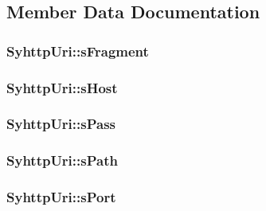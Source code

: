 \subsection{Member Data Documentation}
\hypertarget{struct_syhttp_uri_a57c8361609909d760adc0e6b99043a5c}{
\subsubsection[{s\-Fragment}]{ Syhttp\-Uri\-::s\-Fragment}}\label{d3/d21/struct_syhttp_uri_a57c8361609909d760adc0e6b99043a5c}
\hypertarget{struct_syhttp_uri_abaf0be88b104fda8975080f3d4cc6680}{
\subsubsection[{s\-Host}]{ Syhttp\-Uri\-::s\-Host}}\label{d3/d21/struct_syhttp_uri_abaf0be88b104fda8975080f3d4cc6680}
\hypertarget{struct_syhttp_uri_a632c7b46d941681bebb5f5252c5deeba}{
\subsubsection[{s\-Pass}]{ Syhttp\-Uri\-::s\-Pass}}\label{d3/d21/struct_syhttp_uri_a632c7b46d941681bebb5f5252c5deeba}
\hypertarget{struct_syhttp_uri_ac278bb9a38b2e39ac3135d05be4ef3bb}{
\subsubsection[{s\-Path}]{ Syhttp\-Uri\-::s\-Path}}\label{d3/d21/struct_syhttp_uri_ac278bb9a38b2e39ac3135d05be4ef3bb}
\hypertarget{struct_syhttp_uri_a1d2d2fbc22c31a060029e514f3de4e3f}{
\subsubsection[{s\-Port}]{ Syhttp\-Uri\-::s\-Port}}\label{d3/d21/struct_syhttp_uri_a1d2d2fbc22c31a060029e514f3de4e3f}
